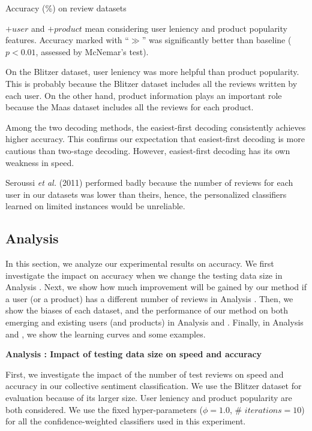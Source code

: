 \documentclass[english]{jnlp_1.4}
\begin{document}
\begin{table}[b]
\caption{Accuracy (\%) on review datasets}
\label{table:acc}

\vspace{4pt}\small
$+\mathit{user}$ and $+\mathit{product}$ mean considering  user leniency and product popularity features. Accuracy marked with ``$\gg$''  was significantly better than baseline ($p < 0.01$, assessed by McNemar's test).
\par
\end{table}

On the Blitzer dataset, user leniency was more helpful than  product popularity.  
This is probably because the Blitzer dataset includes all the reviews written by each user. 
On the other hand, product information plays an important role because the Maas dataset includes all the reviews for each product. 

Among the two decoding methods, the easiest-first decoding consistently achieves higher accuracy. 
This confirms our expectation that easiest-first decoding is more cautious than two-stage decoding.
However, easiest-first decoding has its own weakness in speed.

Seroussi {\em et al.} (2011) performed badly because the number of reviews for each user in our datasets was lower than theirs, hence, the personalized classifiers learned on limited instances would be unreliable.


\subsection{Analysis}

In this section, we analyze our experimental results on accuracy.
We first investigate the impact on accuracy when we change the testing data size  in Analysis  {}.
Next, we show how much improvement will be gained by our method if a user (or a product) has a different number of reviews in Analysis {}.
Then, we show the biases of each dataset, and the performance of our method on both emerging and existing users (and products) in Analysis {} and { }.
Finally, in Analysis {} and { }, we show the learning curves and some examples.


\noindent
\textbf{Analysis {}: Impact of testing data size on speed and accuracy}

First, we investigate the impact of the number of test reviews on speed and accuracy in our collective sentiment classification. 
We use the Blitzer dataset for evaluation because of its larger size. 
User leniency and product popularity are both considered. 
We use the fixed hyper-parameters ($\phi=1.0$, $\#$ $iterations=10$) for all the confidence-weighted classifiers used in this experiment.
\end{document}
